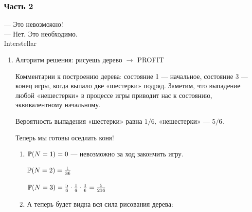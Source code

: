 \subsubsection*{Часть 2}

\begin{flushright}
 — Это невозможно! \\
— Нет. Это необходимо.\\
\textcopyright \hspace{0.1cm} Interstellar
\end{flushright}

\begin{enumerate}
\item
Алгоритм решения: рисуешь дерево $\rightarrow$ PROFIT

\begin{center}


\end{center}

Комментарии к построению дерева: состояние 1 — начальное, состояние 3 — конец игры,
когда выпало две «шестерки» подряд. Заметим, что выпадение любой «нешестерки» в
процессе игры приводит нас к состоянию, эквивалентному начальному.

Вероятность выпадения «шестерки» равна $1/6$, «нешестерки» — $5/6$.

Теперь мы готовы оседлать коня!

\begin{enumerate}
\item $\P(N = 1) = 0$ — невозможно за ход закончить игру.

$\P(N = 2) = \frac{1}{36}$

$\P(N = 3) = \frac{5}{6} \cdot \frac{1}{6} \cdot \frac{1}{6} = \frac{5}{216}$

\item А теперь будет видна вся сила рисования дерева:


\end{enumerate}
\end{enumerate}

